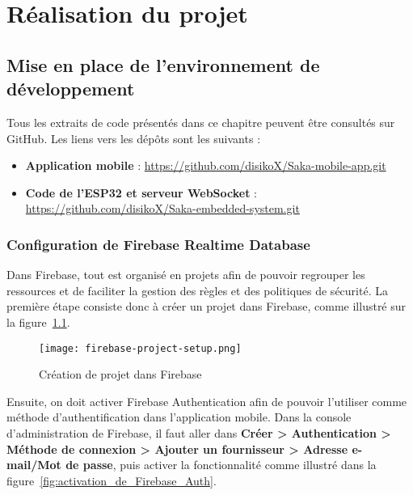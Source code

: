 \pagestyle{fancy}
\fancyhead{} %

\chapter{Réalisation du projet}
\section{Mise en place de l'environnement de développement}
Tous les extraits de code présentés dans ce chapitre peuvent être consultés sur GitHub. Les liens vers les dépôts sont les suivants :

\begin{itemize}
  \item \textbf{Application mobile} : \href{https://github.com/disikoX/Saka-mobile-app.git}{https://github.com/disikoX/Saka-mobile-app.git}
  \item \textbf{Code de l'ESP32 et serveur WebSocket} : \href{https://github.com/disikoX/Saka-embedded-system.git}{https://github.com/disikoX/Saka-embedded-system.git}
\end{itemize}

\subsection{Configuration de Firebase Realtime Database}
Dans Firebase, tout est organisé en projets afin de pouvoir regrouper les ressources et de faciliter la gestion des règles et des politiques de sécurité. La première étape consiste donc à créer un projet dans Firebase, comme illustré sur la figure~\ref{fig:creation_projet_dans_firebase}.

\begin{figure}[H]
   \centering
   \texttt{[image: firebase-project-setup.png]}
   \caption{Création de projet dans Firebase}
   \label{fig:creation_projet_dans_firebase}
\end{figure}

Ensuite, on doit activer Firebase Authentication afin de pouvoir l'utiliser comme méthode d'authentification dans l'application mobile. Dans la console d'administration de Firebase, il faut aller dans \textbf{Créer > Authentication > Méthode de connexion > Ajouter un fournisseur > Adresse e-mail/Mot de passe}, puis activer la fonctionnalité comme illustré dans la figure~\ref{fig:activation_de_Firebase_Auth}.

